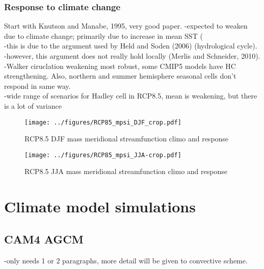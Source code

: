 \documentclass[letterpaper,12pt,titlepage,oneside,final]{book}
\begin{document}
\subsection{Response to climate change}
Start with Knutson and Manabe, 1995, very good paper.
-expected to weaken due to climate change; primarily due to increase in mean SST (\cite{he_anthropogenic_2015}
\\
-this is due to the argument used by Held and Soden (2006) (hydrological cycle).
\\
-however, this argument does not really hold locally (Merlis and Schneider, 2010).
\\
-Walker ciruclation weakening most robust, some CMIP5 models have HC strengthening. Also, northern and summer hemisphere seasonal cells don't respond in same way.
\\
-wide range of scenarios for Hadley cell in RCP8.5, mean is weakening, but there is a lot of variance


\begin{figure}[H]
\centering
\noindent\texttt{[image: ../figures/RCP85\_mpsi\_DJF\_crop.pdf]}\hfill
\caption{RCP8.5 DJF mass meridional streamfunction climo and response}
\end{figure}

\begin{figure}[H]
\centering
\noindent\texttt{[image: ../figures/RCP85\_mpsi\_JJA-crop.pdf]}\hfill
\caption{RCP8.5 JJA mass meridional streamfunction climo and response}
\end{figure}

\chapter{Climate model simulations}
\section{CAM4 AGCM}
-only needs 1 or 2 paragraphs, more detail will be given to convective scheme.
\end{document}

